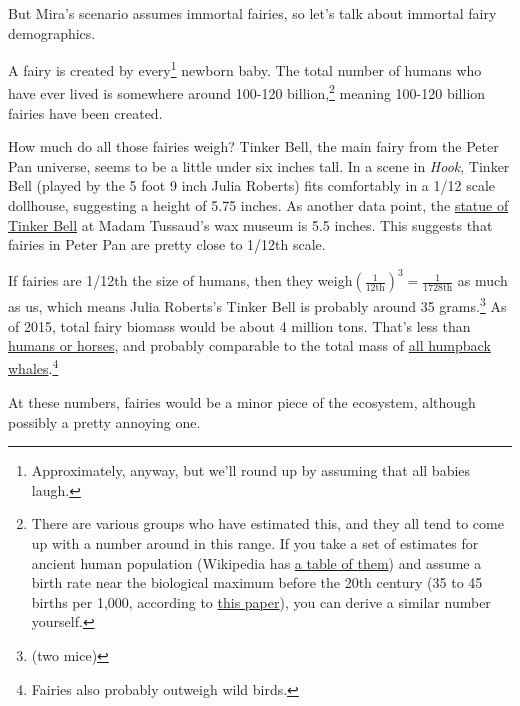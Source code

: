 {{But Mira's scenario assumes immortal fairies, so let's talk about immortal fairy demographics.}

{A fairy is created by every{\footnote{Approximately, anyway, but we'll round up by assuming that all babies laugh.} } newborn baby. The total number of humans who have ever lived is somewhere around 100-120 billion,{\footnote{There are various groups who have estimated this, and they all tend to come up with a number around in this range. If you take a set of estimates for ancient human population (Wikipedia has \href{http://en.wikipedia.org/wiki/World\_population\_estimates}{a table of them}) and assume a birth rate near the biological maximum before the 20th century (35 to 45 births per 1,000, according to \href{http://www.researchgate.net/publication/231918377\_The\_Use\_of\_Historical\_Demography\_in\_Ancient\_History}{this paper}), you can derive a similar number yourself.} } meaning 100-120 billion fairies have been created.}

{How much do all those fairies weigh? Tinker Bell, the main fairy from the Peter Pan universe, seems to be a little under six inches tall. In a scene in \emph{Hook}, Tinker Bell (played by the 5 foot 9 inch Julia Roberts) fits comfortably in a 1/12 scale dollhouse, suggesting a height of 5.75 inches. As another data point, the \href{http://www.madametussauds.com/london/newsandevents/tinkerbell/}{statue of Tinker Bell} at Madam Tussaud's wax museum is 5.5 inches. This suggests that fairies in Peter Pan are pretty close to 1/12th scale.}

{If fairies are 1/12th the size of humans, then they weigh\(\left(\tfrac{1}{12\text{th}}\right) ^3=\tfrac{1}{1728\text{th}}\) as much as us, which means Julia Roberts's Tinker Bell is probably around 35 grams.{\footnote{(two mice)} } As of 2015, total fairy biomass would be about 4 million tons. That's less than \href{http://xkcd.com/1338/}{humans or horses}, and probably comparable to the total mass of \href{http://iwc.int/estimate} {all humpback whales}.{\footnote{Fairies also probably outweigh wild birds.} } }

{At these numbers, fairies would be a minor piece of the ecosystem, although possibly a pretty annoying one.}

}
